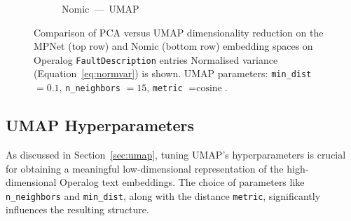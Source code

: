 \documentclass[10pt,oneside]{report}
\begin{document}
\begin{figure}[htbp]
\begin{subfigure}[b]{0.48\textwidth}
    \caption{Nomic --- UMAP}
    \label{fig:umapTest-nomic}
  \end{subfigure}
  \caption{Comparison of PCA versus UMAP dimensionality reduction on the MPNet (top row) and Nomic (bottom row) embedding spaces on Operalog \texttt{FaultDescription} entries Normalised variance (Equation~\ref{eq:normvar}) is shown. UMAP parameters: \texttt{min\_dist} $=0.1$, \texttt{n\_neighbors} $=15$, \texttt{metric} $= \text{cosine}$.}
  \label{fig:dimred-compare}
\end{figure}


\subsection{UMAP Hyperparameters}\label{sec:umaphyperparameters}

%
%


As discussed in Section~\ref{sec:umap}, %
tuning UMAP's hyperparameters is crucial for obtaining a meaningful low-dimensional representation of the high-dimensional Operalog text embeddings. The choice of parameters like \texttt{n\_neighbors} and \texttt{min\_dist}, along with the distance \texttt{metric}, significantly influences the resulting structure.
\end{document}
